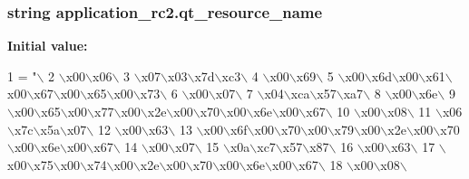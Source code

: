 \subsubsection[{qt\+\_\+resource\+\_\+name}]{\setlength{\rightskip}{0pt plus 5cm}string application\+\_\+rc2.\+qt\+\_\+resource\+\_\+name}\label{namespaceapplication__rc2_a9fa61484b6a02d03b3e2e4e549f1e9ce}
{\bfseries Initial value\+:}
\begin{DoxyCode}
1 = \textcolor{stringliteral}{"\(\backslash\)}
2 \textcolor{stringliteral}{\(\backslash\)x00\(\backslash\)x06\(\backslash\)}
3 \textcolor{stringliteral}{\(\backslash\)x07\(\backslash\)x03\(\backslash\)x7d\(\backslash\)xc3\(\backslash\)}
4 \textcolor{stringliteral}{\(\backslash\)x00\(\backslash\)x69\(\backslash\)}
5 \textcolor{stringliteral}{\(\backslash\)x00\(\backslash\)x6d\(\backslash\)x00\(\backslash\)x61\(\backslash\)x00\(\backslash\)x67\(\backslash\)x00\(\backslash\)x65\(\backslash\)x00\(\backslash\)x73\(\backslash\)}
6 \textcolor{stringliteral}{\(\backslash\)x00\(\backslash\)x07\(\backslash\)}
7 \textcolor{stringliteral}{\(\backslash\)x04\(\backslash\)xca\(\backslash\)x57\(\backslash\)xa7\(\backslash\)}
8 \textcolor{stringliteral}{\(\backslash\)x00\(\backslash\)x6e\(\backslash\)}
9 \textcolor{stringliteral}{\(\backslash\)x00\(\backslash\)x65\(\backslash\)x00\(\backslash\)x77\(\backslash\)x00\(\backslash\)x2e\(\backslash\)x00\(\backslash\)x70\(\backslash\)x00\(\backslash\)x6e\(\backslash\)x00\(\backslash\)x67\(\backslash\)}
10 \textcolor{stringliteral}{\(\backslash\)x00\(\backslash\)x08\(\backslash\)}
11 \textcolor{stringliteral}{\(\backslash\)x06\(\backslash\)x7c\(\backslash\)x5a\(\backslash\)x07\(\backslash\)}
12 \textcolor{stringliteral}{\(\backslash\)x00\(\backslash\)x63\(\backslash\)}
13 \textcolor{stringliteral}{\(\backslash\)x00\(\backslash\)x6f\(\backslash\)x00\(\backslash\)x70\(\backslash\)x00\(\backslash\)x79\(\backslash\)x00\(\backslash\)x2e\(\backslash\)x00\(\backslash\)x70\(\backslash\)x00\(\backslash\)x6e\(\backslash\)x00\(\backslash\)x67\(\backslash\)}
14 \textcolor{stringliteral}{\(\backslash\)x00\(\backslash\)x07\(\backslash\)}
15 \textcolor{stringliteral}{\(\backslash\)x0a\(\backslash\)xc7\(\backslash\)x57\(\backslash\)x87\(\backslash\)}
16 \textcolor{stringliteral}{\(\backslash\)x00\(\backslash\)x63\(\backslash\)}
17 \textcolor{stringliteral}{\(\backslash\)x00\(\backslash\)x75\(\backslash\)x00\(\backslash\)x74\(\backslash\)x00\(\backslash\)x2e\(\backslash\)x00\(\backslash\)x70\(\backslash\)x00\(\backslash\)x6e\(\backslash\)x00\(\backslash\)x67\(\backslash\)}
18 \textcolor{stringliteral}{\(\backslash\)x00\(\backslash\)x08\(\backslash\)}

\end{DoxyCode}
